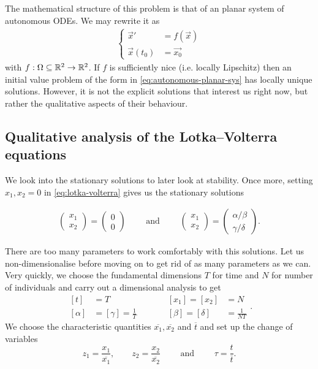 The mathematical structure of this problem is that of an planar
system of autonomous ODEs. We may rewrite it as
\begin{align}
  \label{eq:autonomous-planar-sys}
  \begin{cases}
    \vec{x}'     &= f(\vec{x}) \\
    \vec{x}(t_0) &= \vec{x_0}
  \end{cases}
\end{align}
with $f : \Omega \subseteq \mathbb{R}^2 \to \mathbb{R}^2$. If $f$ is sufficiently nice (i.e.
locally Lipschitz) then an initial value problem of the form in
\ref{eq:autonomous-planar-sys} has locally unique solutions. However, it is not
the explicit solutions that interest us right now, but rather the qualitative
aspects of their behaviour.

\subsection{Qualitative analysis of the Lotka--Volterra equations}

We look into the stationary solutions to later look at stability. Once more,
setting $x_1, x_2 = 0$ in \ref{eq:lotka-volterra} gives us the stationary
solutions

\begin{align*}
  \left(
    \begin{array}
      {c}
      x_1 \\ x_2
    \end{array}
  \right) = \left(
    \begin{array}
      {c}
      0 \\ 0
    \end{array}
  \right) \qquad \text{ and } \qquad \left(
    \begin{array}
      {c}
      x_1 \\ x_2
    \end{array}
  \right) = \left(
    \begin{array}
      {c}
      \alpha / \beta \\ \gamma / \delta
    \end{array}
  \right).
\end{align*}

There are too many parameters to work comfortably with this solutions. Let us
non-dimensionalise before moving on to get rid of as many parameters as we can.
Very quickly, we choose the fundamental dimensions $T$ for time and $N$ for
number of individuals and carry out a dimensional analysis to get
\[
\begin{array}{rlcrl}
  [t]                   & = T                                   & \qquad & [x_1] = [x_2]                                & = N \\
  \left[ \alpha \right] & = \left[ \gamma \right] = \frac{1}{T} &        & \left[ \beta \right] = \left[ \delta \right] & = \frac{1}{NT}
\end{array}
.
\]
We choose the characteristic quantities $\overline{x_1}, \overline{x_2}$ and
$\overline{t}$ and set up the change of variables
\[
  z_1 = \frac{x_1}{\overline{x_1}},\qquad
  z_2 = \frac{x_2}{\overline{x_2}} \qquad \text{ and } \qquad
  \tau = \frac{t}{\overline{t}}.
\]

